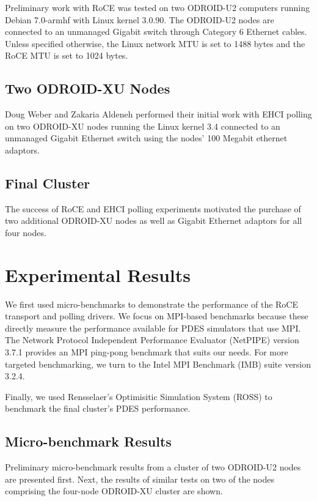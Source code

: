\documentclass[11pt]{book}
\begin{document}
Preliminary work with RoCE was tested on two ODROID-U2 computers running Debian
7.0-armhf with Linux kernel 3.0.90. The ODROID-U2 nodes are connected to an
unmanaged Gigabit switch through Category 6 Ethernet cables. Unless specified
otherwise, the Linux network MTU is set to 1488 bytes and the RoCE MTU is set to
1024 bytes.

\section{\textbf{Two ODROID-XU Nodes}}

Doug Weber and Zakaria Aldeneh performed their initial work with EHCI polling on
two ODROID-XU nodes running the Linux kernel 3.4 connected to an unmanaged
Gigabit Ethernet switch using the nodes' 100 Megabit ethernet adaptors.

\section{\textbf{Final Cluster}}

The success of RoCE and EHCI polling experiments motivated the purchase of two
additional ODROID-XU nodes as well as Gigabit Ethernet adaptors for all four
nodes.

\newpage
\chapter{Experimental Results}
\label{results}

We first used micro-benchmarks to demonstrate the performance of the RoCE
transport and polling drivers. We focus on MPI-based benchmarks because these
directly measure the performance available for PDES simulators that use MPI. The
Network Protocol Independent Performance Evaluator (NetPIPE) \cite{NetPIPE}
version 3.7.1 provides an MPI ping-pong benchmark that suits our needs. For more
targeted benchmarking, we turn to the Intel MPI Benchmark (IMB) suite version
3.2.4.

Finally, we used Rensselaer's Optimisitic Simulation System (ROSS) to benchmark
the final cluster's PDES performance.

\section{\textbf{Micro-benchmark Results}}

Preliminary micro-benchmark results from a cluster of two ODROID-U2 nodes are
presented first. Next, the results of similar tests on two of the nodes
comprising the four-node ODROID-XU cluster are shown.
\end{document}
